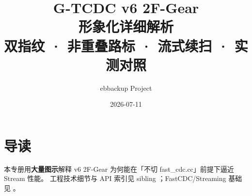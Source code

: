 \documentclass[12pt,a4paper,openany]{ctexbook}
\title{G-TCDC v6 2F-Gear\\[0.2em]\large 形象化详细解析\\[0.15em]\normalsize 双指纹 · 非重叠路标 · 流式续扫 · 实测对照}
\author{ebbackup Project}
\date{2026-07-11}
\begin{document}
\frontmatter
\maketitle
\chapter*{导读}
本专册用\textbf{大量图示}解释 v6 2F-Gear 为何能在「不切 fast\_cdc.cc」前提下逼近 Stream 性能。
工程技术细节与 API 索引见 sibling ；FastCDC/Streaming 基础见 。
\tableofcontents
\listoffigures

\mainmatter







\appendix


\backmatter
\end{document}
